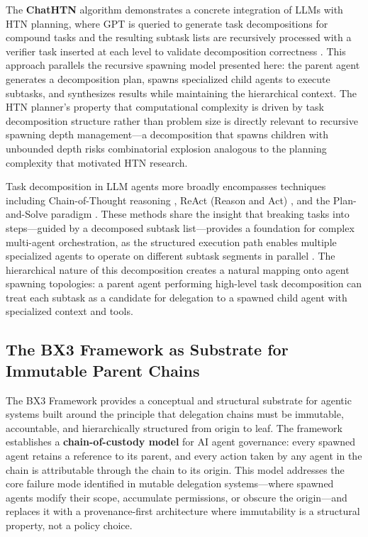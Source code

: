 The \textbf{ChatHTN} algorithm demonstrates a concrete integration of LLMs with HTN planning, where GPT is queried to generate task decompositions for compound tasks and the resulting subtask lists are recursively processed with a verifier task inserted at each level to validate decomposition correctness \cite{arxiv2505.11814}. This approach parallels the recursive spawning model presented here: the parent agent generates a decomposition plan, spawns specialized child agents to execute subtasks, and synthesizes results while maintaining the hierarchical context. The HTN planner's property that computational complexity is driven by task decomposition structure rather than problem size is directly relevant to recursive spawning depth management---a decomposition that spawns children with unbounded depth risks combinatorial explosion analogous to the planning complexity that motivated HTN research.

Task decomposition in LLM agents more broadly encompasses techniques including Chain-of-Thought reasoning \cite{chi2022chainofthought}, ReAct (Reason and Act) \cite{yao2022react}, and the Plan-and-Solve paradigm \cite{wang2023planandsolve}. These methods share the insight that breaking tasks into steps---guided by a decomposed subtask list---provides a foundation for complex multi-agent orchestration, as the structured execution path enables multiple specialized agents to operate on different subtask segments in parallel \cite{apxml2025taskdecomposition}. The hierarchical nature of this decomposition creates a natural mapping onto agent spawning topologies: a parent agent performing high-level task decomposition can treat each subtask as a candidate for delegation to a spawned child agent with specialized context and tools.

\subsection{The BX3 Framework as Substrate for Immutable Parent Chains}

The BX3 Framework provides a conceptual and structural substrate for agentic systems built around the principle that delegation chains must be immutable, accountable, and hierarchically structured from origin to leaf. The framework establishes a \textbf{chain-of-custody model} for AI agent governance: every spawned agent retains a reference to its parent, and every action taken by any agent in the chain is attributable through the chain to its origin. This model addresses the core failure mode identified in mutable delegation systems---where spawned agents modify their scope, accumulate permissions, or obscure the origin---and replaces it with a provenance-first architecture where immutability is a structural property, not a policy choice.

